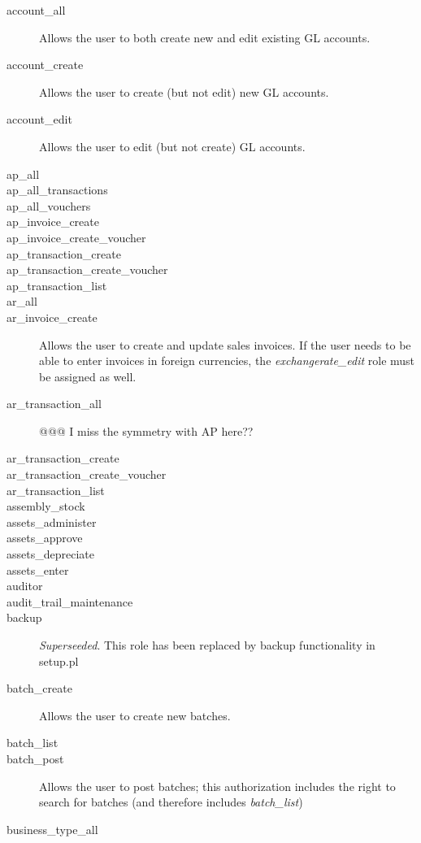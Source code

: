 \begin{description}
\item [account\_all] Allows the user to both create new and edit existing GL accounts.
\item [account\_create] Allows the user to create (but not edit) new GL accounts.
\item [account\_edit] Allows the user to edit (but not create) GL accounts.
\item [ap\_all]
\item [ap\_all\_transactions]
\item [ap\_all\_vouchers]
\item [ap\_invoice\_create]
\item [ap\_invoice\_create\_voucher]
\item [ap\_transaction\_create]
\item [ap\_transaction\_create\_voucher]
\item [ap\_transaction\_list]
\item [ar\_all]
\item [ar\_invoice\_create] Allows the user to create and update sales invoices. If the
   user needs to be able to enter invoices in foreign currencies, the
   \emph{exchangerate\_edit} role must be assigned as well.
\item [ar\_transaction\_all] @@@ I miss the symmetry with AP here??
\item [ar\_transaction\_create]
\item [ar\_transaction\_create\_voucher]
\item [ar\_transaction\_list]
\item [assembly\_stock]
\item [assets\_administer]
\item [assets\_approve]
\item [assets\_depreciate]
\item [assets\_enter]
\item [auditor]
\item [audit\_trail\_maintenance]
\item [backup] \emph{Superseeded}. This role has been replaced by backup functionality
   in setup.pl
\item [batch\_create] Allows the user to create new batches.
\item [batch\_list]
\item [batch\_post] Allows the user to post batches; this authorization includes the
   right to search for batches (and therefore includes \emph{batch\_list})
\item [business\_type\_all]

\end{description}
